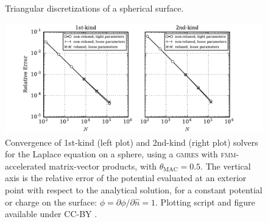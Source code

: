 \documentclass[final,3p,times]{elsarticle}
\newcommand{\fmm}{\textsc{fmm}\xspace}
\newcommand{\gmres}{\textsc{gmres}\xspace}
\newcommand{\partialdi}[2]{\partial #1 / \partial #2}
\newcommand{\nhat}{\hat{n}}
\begin{document}
\begin{figure}%
\begin{center}
	\qquad
	\caption{Triangular discretizations of a spherical surface.}
	\label{fig:glob_spheres}
\end{center}
\end{figure}
%
\begin{figure}[t]
\begin{center}
	\includegraphics[natwidth=3in,natheight=2in,width=1.0\textwidth]{LaplaceConvergence.pdf}
	\caption{Convergence of 1st-kind (left plot) and 2nd-kind (right plot) solvers for the Laplace equation on a sphere, using a \gmres with \fmm-accelerated matrix-vector products, with $\theta_{\text{MAC}} = 0.5$. The vertical axis is the relative error of the potential evaluated at an exterior point with respect to the analytical solution, for a constant potential or charge on the surface: $\phi = \partialdi{\phi}{\nhat} = 1$. Plotting script and figure available under CC-BY \cite{WangLaytonBarba2016-figshare2}.}
	\label{fig:laplaceconvergence}
\end{center}
\end{figure}
\end{document}
